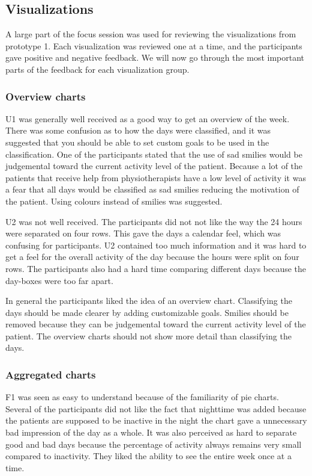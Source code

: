 \subsection{Visualizations}
A large part of the focus session was used for reviewing the visualizations from prototype 1. Each visualization was reviewed one at a time, and the participants gave positive and negative feedback. We will now go through the most important parts of the feedback for each visualization group.

\subsubsection{Overview charts}
U1 was generally well received as a good way to get an overview of the week. There was some confusion as to how the days were classified, and it was suggested that you should be able to set custom goals to be used in the classification. One of the participants stated that the use of sad smilies would be judgemental toward the current activity level of the patient. Because a lot of the patients that receive help from physiotherapists have a low level of activity it was a fear that all days would be classified as sad smilies reducing the motivation of the patient. Using colours instead of smilies was suggested.

U2 was not well received. The participants did not not like the way the 24 hours were separated on four rows. This gave the days a calendar feel, which was confusing for participants. U2 contained too much information and it was hard to get a feel for the overall activity of the day because the hours were split on four rows. The participants also had a hard time comparing different days because the day-boxes were too far apart.

In general the participants liked the idea of an overview chart. Classifying the days should be made clearer by adding customizable goals. Smilies should be removed because they can be judgemental toward the current activity level of the patient. The overview charts should not show more detail than classifying the days.

\subsubsection{Aggregated charts}
F1 was seen as easy to understand because of the familiarity of pie charts. Several of the participants did not like the fact that nighttime was added because the patients are supposed to be inactive in the night the chart gave a unnecessary bad impression of the day as a whole. It was also perceived as hard to separate good and bad days because the percentage of activity always remains very small compared to inactivity. They liked the ability to see the entire week once at a time.

